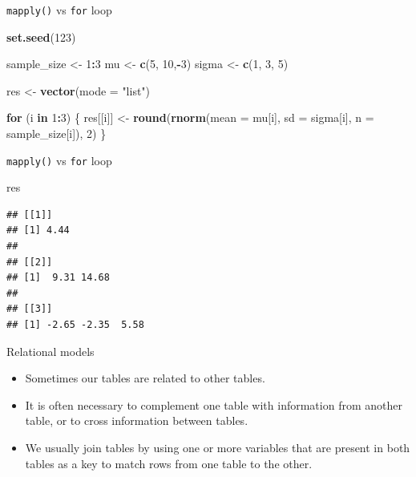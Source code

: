 \documentclass[ignorenonframetext,]{beamer}
\newenvironment{Shaded}{\begin{snugshade}}{\end{snugshade}}
\newcommand{\ControlFlowTok}[1]{\textcolor[rgb]{0.13,0.29,0.53}{\textbf{#1}}}
\newcommand{\DataTypeTok}[1]{\textcolor[rgb]{0.13,0.29,0.53}{#1}}
\newcommand{\DecValTok}[1]{\textcolor[rgb]{0.00,0.00,0.81}{#1}}
\newcommand{\KeywordTok}[1]{\textcolor[rgb]{0.13,0.29,0.53}{\textbf{#1}}}
\newcommand{\NormalTok}[1]{#1}
\newcommand{\OperatorTok}[1]{\textcolor[rgb]{0.81,0.36,0.00}{\textbf{#1}}}
\newcommand{\StringTok}[1]{\textcolor[rgb]{0.31,0.60,0.02}{#1}}
\begin{document}
\begin{frame}[fragile]{\texttt{mapply()} vs \texttt{for} loop}
\protect\hypertarget{mapply-vs-for-loop}{}

\begin{Shaded}
\begin{Highlighting}[]
\KeywordTok{set.seed}\NormalTok{(}\DecValTok{123}\NormalTok{)}

\NormalTok{sample_size <-}\StringTok{ }\DecValTok{1}\OperatorTok{:}\DecValTok{3}
\NormalTok{mu <-}\StringTok{ }\KeywordTok{c}\NormalTok{(}\DecValTok{5}\NormalTok{, }\DecValTok{10}\NormalTok{,}\OperatorTok{-}\DecValTok{3}\NormalTok{)}
\NormalTok{sigma <-}\StringTok{ }\KeywordTok{c}\NormalTok{(}\DecValTok{1}\NormalTok{, }\DecValTok{3}\NormalTok{, }\DecValTok{5}\NormalTok{)}

\NormalTok{res <-}\StringTok{ }\KeywordTok{vector}\NormalTok{(}\DataTypeTok{mode =} \StringTok{"list"}\NormalTok{)}

\ControlFlowTok{for}\NormalTok{ (i }\ControlFlowTok{in} \DecValTok{1}\OperatorTok{:}\DecValTok{3}\NormalTok{) \{}
\NormalTok{  res[[i]] <-}\StringTok{ }\KeywordTok{round}\NormalTok{(}\KeywordTok{rnorm}\NormalTok{(}\DataTypeTok{mean =}\NormalTok{ mu[i],}
                          \DataTypeTok{sd =}\NormalTok{ sigma[i],}
                          \DataTypeTok{n =}\NormalTok{ sample_size[i]),}
                    \DecValTok{2}\NormalTok{)}
\NormalTok{\}}
\end{Highlighting}
\end{Shaded}

\end{frame}

\begin{frame}[fragile]{\texttt{mapply()} vs \texttt{for} loop}
\protect\hypertarget{mapply-vs-for-loop-1}{}

\begin{Shaded}
\begin{Highlighting}[]
\NormalTok{res}
\end{Highlighting}
\end{Shaded}

\begin{verbatim}
## [[1]]
## [1] 4.44
## 
## [[2]]
## [1]  9.31 14.68
## 
## [[3]]
## [1] -2.65 -2.35  5.58
\end{verbatim}

\end{frame}

\begin{frame}{Relational models}
\protect\hypertarget{relational-models}{}

\begin{itemize}
\item
  Sometimes our tables are related to other tables.
\item
  It is often necessary to complement one table with information from
  another table, or to cross information between tables.
\item
  We usually join tables by using one or more variables that are present
  in both tables as a key to match rows from one table to the other.
\end{itemize}

\end{frame}
\end{document}
